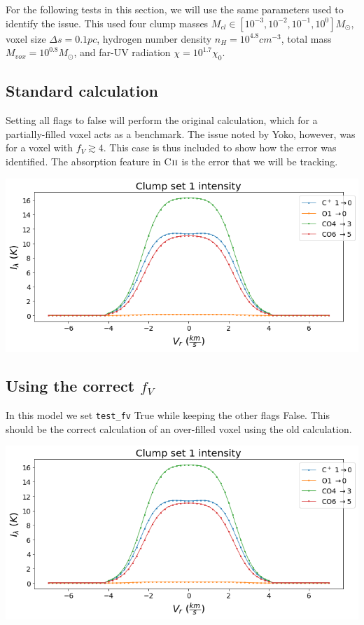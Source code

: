 \documentclass[a4paper]{article}
\newcommand{\mathsc}[1]{{\normalfont\textsc{#1}}}
\begin{document}
    For the following tests in this section, we will use the same parameters used to identify the issue.
    This used four clump masses \(M_{cl} \in [10^{-3}, 10^{-2}, 10^{-1}, 10^{0}] M_\odot\),
    voxel size \(\Delta s = 0.1 pc\),
    hydrogen number density \(n_H = 10^{4.8} cm^{-3}\),
    total mass \(M_{vox} = 10^{0.8} M_\odot\),
    and far-UV radiation \(\chi = 10^{1.7} \chi_0\).

    \subsection{Standard calculation}

    Setting all flags to false will perform the original calculation, which for a partially-filled voxel acts as a benchmark.
    The issue noted by Yoko, however, was for a voxel with \(f_V \gtrsim 4\).
    This case is thus included to show how the error was identified.
    The absorption feature in C\(\mathsc{ii}\) is the error that we will be tracking.

    \includegraphics*[width=\linewidth]{voxel_error_original.png}

    \subsection{Using the correct \(f_V\)}

    In this model we set \texttt{test\_fv} True while keeping the other flags False.
    This should be the correct calculation of an over-filled voxel using the old calculation.

    \includegraphics*[width=\linewidth]{voxel_error_fv.png}
\end{document}
